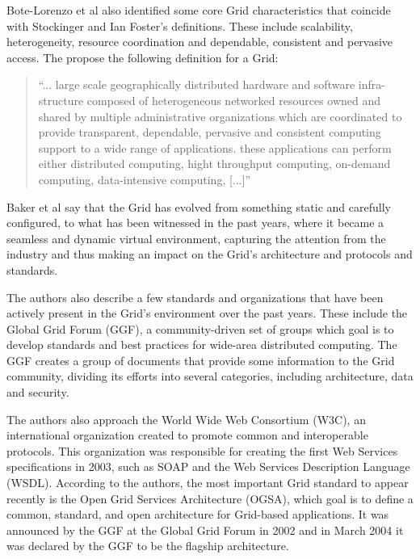 Bote-Lorenzo et al also identified some core Grid characteristics that coincide with Stockinger and Ian Foster's definitions. These include scalability, heterogeneity, resource coordination and dependable, consistent and pervasive access. The propose the following definition for a Grid:

\begin{quote}
``... large scale geographically distributed hardware and software infra-structure composed of heterogeneous networked resources owned and shared by multiple administrative organizations which are coordinated to provide transparent, dependable, pervasive and consistent computing support to a wide range of applications. these applications can perform either distributed computing, hight throughput computing, on-demand computing, data-intensive computing, [...]''\cite{bote-lorenzo}
\end{quote}

Baker et al say that the Grid has evolved from something static and carefully configured, to what has been witnessed in the past years, where it became a seamless and dynamic virtual environment, capturing the attention from the industry and thus making an impact on the Grid's architecture and protocols and standards. 

The authors also describe a few standards and organizations that have been actively present in the Grid's environment over the past years. These include the Global Grid Forum (GGF), a community-driven set of groups which goal is to develop standards and best practices for wide-area distributed computing. The GGF creates a group of documents that provide some information to the Grid community, dividing its efforts into several categories, including architecture, data and security.

The authors also approach the World Wide Web Consortium (W3C), an international organization created to promote common and interoperable protocols. This organization was responsible for creating the first Web Services specifications in 2003, such as SOAP and the Web Services Description Language (WSDL).
According to the authors, the most important Grid standard to appear recently is the Open Grid Services Architecture (OGSA), which goal is to define a common, standard, and open architecture for Grid-based applications. It was announced by the GGF at the Global Grid Forum in 2002 and in March 2004 it was declared by the GGF to be the flagship architecture.\cite{grid-standards}

